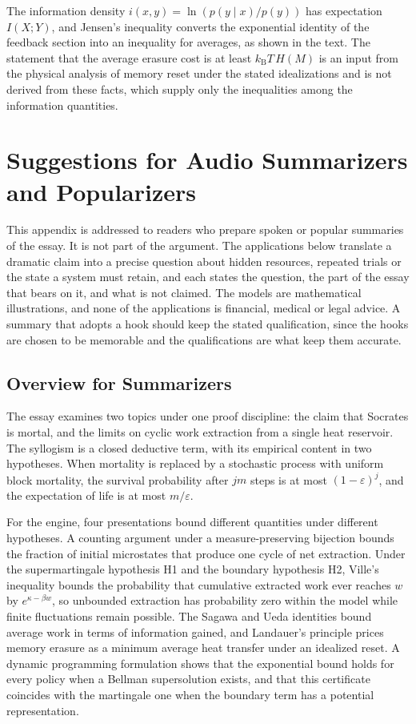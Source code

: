 \documentclass[11pt]{article}
\theoremstyle{definition}
\theoremstyle{remark}
\newcommand{\kB}{k_{\mathrm B}}
\begin{document}
The information density $i(x,y) = \ln (p(y \mid x)/p(y))$ has expectation $I(X;Y)$, and Jensen's inequality converts the exponential identity of the feedback section into an inequality for averages, as shown in the text. The statement that the average erasure cost is at least $\kB T\, H(M)$ is an input from the physical analysis of memory reset under the stated idealizations and is not derived from these facts, which supply only the inequalities among the information quantities.

\section{Suggestions for Audio Summarizers and Popularizers}\label{app:popular}

This appendix is addressed to readers who prepare spoken or popular summaries of the essay. It is not part of the argument. The applications below translate a dramatic claim into a precise question about hidden resources, repeated trials or the state a system must retain, and each states the question, the part of the essay that bears on it, and what is not claimed. The models are mathematical illustrations, and none of the applications is financial, medical or legal advice. A summary that adopts a hook should keep the stated qualification, since the hooks are chosen to be memorable and the qualifications are what keep them accurate.

\subsection{Overview for Summarizers}

The essay examines two topics under one proof discipline: the claim that Socrates is mortal, and the limits on cyclic work extraction from a single heat reservoir. The syllogism is a closed deductive term, with its empirical content in two hypotheses. When mortality is replaced by a stochastic process with uniform block mortality, the survival probability after $jm$ steps is at most $(1-\varepsilon)^j$, and the expectation of life is at most $m/\varepsilon$.

For the engine, four presentations bound different quantities under different hypotheses. A counting argument under a measure-preserving bijection bounds the fraction of initial microstates that produce one cycle of net extraction. Under the supermartingale hypothesis H1 and the boundary hypothesis H2, Ville's inequality bounds the probability that cumulative extracted work ever reaches $w$ by $e^{\kappa - \beta w}$, so unbounded extraction has probability zero within the model while finite fluctuations remain possible. The Sagawa and Ueda identities bound average work in terms of information gained, and Landauer's principle prices memory erasure as a minimum average heat transfer under an idealized reset. A dynamic programming formulation shows that the exponential bound holds for every policy when a Bellman supersolution exists, and that this certificate coincides with the martingale one when the boundary term has a potential representation.
\end{document}
